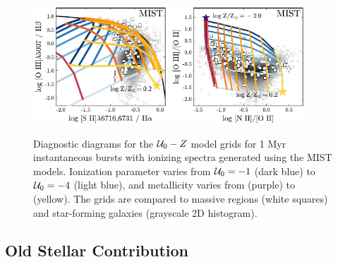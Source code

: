 \begin{figure}[!htbp]
  \begin{centering}
    \includegraphics[width=0.45\textwidth]{manuscript/chapter2/f26a.pdf}
    \includegraphics[width=0.45\textwidth]{manuscript/chapter2/f26b.pdf}
    \caption{Diagnostic diagrams for the $\mathcal{U}_{0}-Z$ model grids for 1 Myr instantaneous bursts with ionizing spectra generated using the MIST models. Ionization parameter varies from $\mathcal{U}_{0}=-1$ (dark blue) to $\mathcal{U}_{0}=-4$ (light blue), and metallicity varies from  (purple) to  (yellow). The grids are compared to massive \hii regions (white squares) and star-forming galaxies (grayscale 2D histogram).}
    \label{fig:MIST:altRatios}
  \end{centering}
\end{figure}



\subsection{Old Stellar Contribution}\label{sec:secondary:old}

